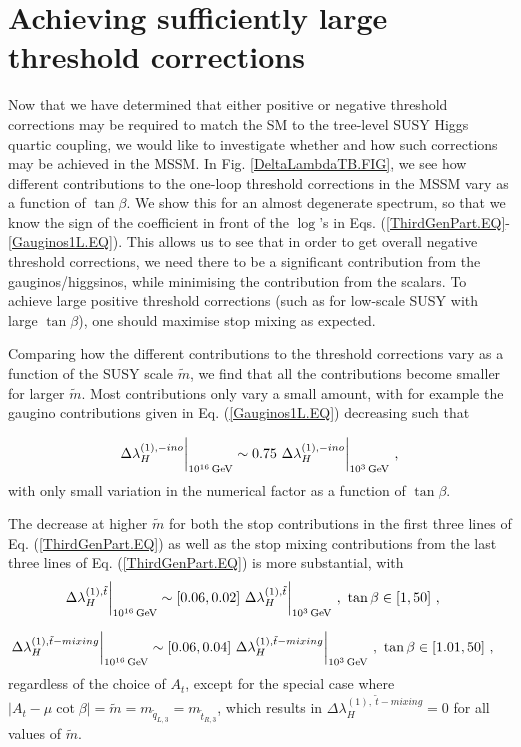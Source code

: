 \documentclass[12pt]{article}
\newcommand{\beq}{\begin{equation}}
\newcommand{\eeq}{\end{equation}}
\newcommand{\sq}{\tilde{q}}
\newcommand{\mStL}{m_{\sq_{L,3}}}
\newcommand{\mStR}{m_{\tilde{t}_{R,3}}}
\newcommand{\mS}{\tilde{m}}
\newcommand{\gev}{{\, {\rm GeV}}}
\begin{document}
\section{Achieving sufficiently large threshold corrections}
\label{Corrections.SEC}

Now that we have determined that either positive or negative threshold corrections may be required to match the SM to the tree-level SUSY Higgs quartic coupling, we would like to investigate whether and how such corrections may be achieved in the MSSM. In Fig. \ref{DeltaLambdaTB.FIG}, we see how different contributions to the one-loop threshold corrections in the MSSM vary as a function of $\tan\beta$. We show this for an almost degenerate spectrum, so that we know the sign of the coefficient in front of the $\log$'s in Eqs. (\ref{ThirdGenPart.EQ}-\ref{Gauginos1L.EQ}). This allows us to see that in order to get overall negative threshold corrections, we need there to be a significant contribution from the gauginos/higgsinos, while minimising the contribution from the scalars. To achieve large positive threshold corrections (such as for low-scale SUSY with large $\tan\beta$), one should maximise stop mixing as expected.


Comparing how the different contributions to the threshold corrections vary as a function of the SUSY scale $\mS$, we find that all the contributions become smaller for larger $\mS$. Most contributions only vary a small amount, with for example the gaugino contributions given in Eq. (\ref{Gauginos1L.EQ}) decreasing such that

\beq
\Delta\lambda_H^{(1),-ino}\biggr\rvert_{10^{16} \gev}\sim 0.75 ~ \Delta\lambda_H^{(1),-ino}\biggr\rvert_{10^{3} \gev}\ ,
\eeq
with only small variation in the numerical factor as a function of $\tan\beta$.

The decrease at higher $\mS$ for both the stop contributions in the first three lines of Eq. (\ref{ThirdGenPart.EQ}) as well as the stop mixing contributions from the last three lines of Eq. (\ref{ThirdGenPart.EQ}) is more substantial, with
\begin{align}
&\Delta\lambda_H^{(1),\tilde{t}}\biggr\rvert_{10^{16} \gev} \sim [0.06,0.02] ~ \Delta\lambda_H^{(1),\tilde{t}}\biggr\rvert_{10^{3} \gev} \ , ~\tan\beta \in [1,50] \ ,
\end{align}

\begin{align}
&\Delta\lambda_H^{(1),\tilde{t}-mixing}\biggr\rvert_{10^{16} \gev} \sim [0.06,0.04] ~ \Delta\lambda_H^{(1),\tilde{t}-mixing}\biggr\rvert_{10^{3} \gev} \ , ~\tan\beta \in [1.01,50] \ ,
\end{align}
regardless of the choice of $A_t$, except for the special case where $|A_t -\mu \cot\beta|= \mS = \mStL = \mStR$, which results in $\Delta\lambda_H^{(1),~\tilde{t}-mixing} = 0$ for all values of $\mS$. 
\end{document}
